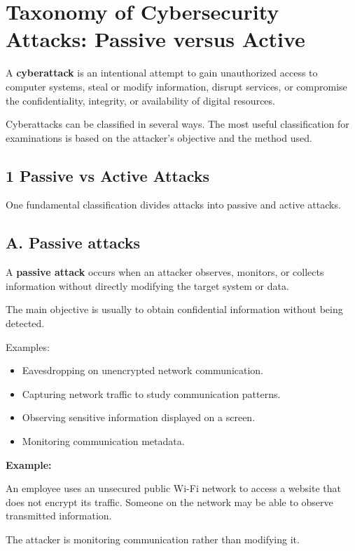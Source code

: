 \section{Taxonomy of Cybersecurity Attacks: Passive versus Active}


A \textbf{cyberattack} is an intentional attempt to gain unauthorized access to computer systems, steal or modify information, disrupt services, or compromise the confidentiality, integrity, or availability of digital resources.

Cyberattacks can be classified in several ways. The most useful classification for examinations is based on the attacker's objective and the method used.

\subsection{1 Passive vs Active Attacks}

One fundamental classification divides attacks into passive and active attacks.

\subsection{A. Passive attacks}

A \textbf{passive attack} occurs when an attacker observes, monitors, or collects information without directly modifying the target system or data.

The main objective is usually to obtain confidential information without being detected.

Examples:

\begin{itemize}
\item Eavesdropping on unencrypted network communication.
\item Capturing network traffic to study communication patterns.
\item Observing sensitive information displayed on a screen.
\item Monitoring communication metadata.
\end{itemize}

\textbf{Example:}

An employee uses an unsecured public Wi-Fi network to access a website that does not encrypt its traffic. Someone on the network may be able to observe transmitted information.

The attacker is monitoring communication rather than modifying it.

